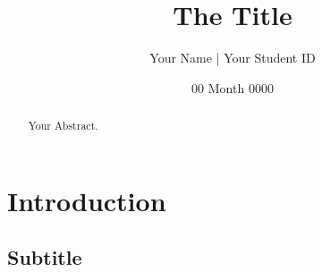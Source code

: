 \documentclass{uofg-basic-article}
\title{The Title} %
\author{Your Name | Your Student ID} %
\date{00 Month 0000} %
\begin{document}
\maketitle

\begin{abstract}
    Your Abstract.
\end{abstract}

\tableofcontents


\section{Introduction}
\lipsum[1-3]

\subsection*{Subtitle}
\lipsum[4-5]






\end{document}

